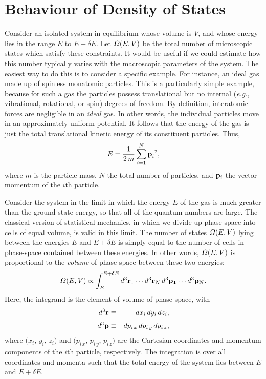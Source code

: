 \section{Behaviour of Density of States}\label{s3.13}
Consider an
 isolated system in equilibrium whose  volume is $V$, and whose energy  lies in the
range $E$ to $E+\delta E$.
Let ${\mit\Omega}(E, V)$ be the total number of microscopic  states which
satisfy these constraints.
It would be useful if we could estimate how
this number  typically varies with the macroscopic parameters of the system.
The easiest way to do this is to consider a specific example. For instance,
 an ideal gas made up of spinless monatomic particles. This is a particularly 
simple example,
because for such a gas the particles possess translational but no
 internal ({\em e.g.},  vibrational, rotational, or spin) degrees of freedom.
By definition, interatomic forces are negligible in an {\em ideal}\/ gas. In other
words, the individual particles 
move in an approximately uniform potential.
It follows that the energy of the gas is just 
 the total translational kinetic energy of its constituent particles. Thus,
\begin{equation}
E = \frac{1}{2\,m}\sum_{i=1}^N {\bf p}_i^{~2},\label{e3.20}
\end{equation}
where $m$ is the particle mass, $N$ the total number of particles, 
and ${\bf p}_i$ the
vector momentum of the $i$th particle.

Consider the system in the 
 limit in which the energy $E$ of the gas is 
much greater than the ground-state energy,  so that all of the
quantum numbers are large.
The classical version of statistical mechanics, in which we
divide up phase-space into cells of equal volume, is valid in this limit. 
The number of
states ${\mit\Omega}(E, V)$ lying between the energies $E$ and $E+\delta E$ is simply
equal to the number of cells in phase-space contained between these energies.
In other words, ${\mit\Omega}(E, V)$ is proportional to the {\em volume}\/ of 
phase-space between these two energies:
\begin{equation}
{\mit\Omega}(E, V) \propto \int^{E+\delta E}_Ed^3{\bf r}_1\cdots d^3{\bf r}_N\,
d^3 {\bf p_1}\cdots d^3 {\bf p_N}.\label{e3.21}
\end{equation}
Here, the integrand is the element of volume of phase-space, with
\begin{eqnarray}
d^3{\bf r}& \equiv & dx_i\,dy_i\,dz_i,\\[0.5ex]
d^3{\bf p}&\equiv & dp_{i\,x}\,dp_{i\,y} \,dp_{i\,z},
\end{eqnarray}
 where  $(x_i$, $y_i$, $z_i)$ and  $(p_{i\,x}$, $p_{i\,y}$, $p_{i\,z})$
are the Cartesian coordinates and momentum components of the $i$th particle, 
respectively.
The integration is over all coordinates and momenta such that the total energy
of the system lies between $E$ and $E+\delta E$.

